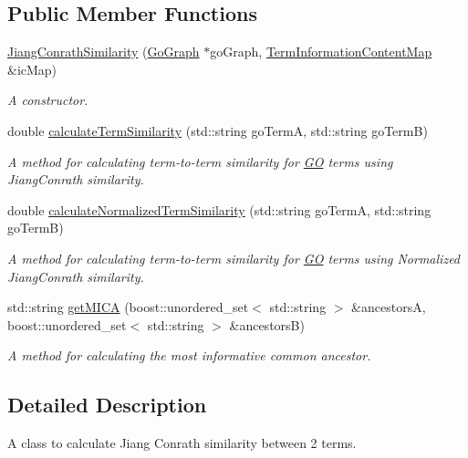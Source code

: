 \subsection*{Public Member Functions}
\begin{DoxyCompactItemize}
\item 
\hyperlink{classJiangConrathSimilarity_addd16c8b26721f64b954c3006aa2ed26}{Jiang\+Conrath\+Similarity} (\hyperlink{classGoGraph}{Go\+Graph} $\ast$go\+Graph, \hyperlink{classTermInformationContentMap}{Term\+Information\+Content\+Map} \&ic\+Map)
\begin{DoxyCompactList}\small\item\em A constructor. \end{DoxyCompactList}\item 
double \hyperlink{classJiangConrathSimilarity_a110fcc0d8b68b6dde9e90d897c859034}{calculate\+Term\+Similarity} (std\+::string go\+TermA, std\+::string go\+TermB)
\begin{DoxyCompactList}\small\item\em A method for calculating term-\/to-\/term similarity for \hyperlink{namespaceGO}{GO} terms using Jiang\+Conrath similarity. \end{DoxyCompactList}\item 
double \hyperlink{classJiangConrathSimilarity_a489dcbef15f4a5063af79cb03920cdf9}{calculate\+Normalized\+Term\+Similarity} (std\+::string go\+TermA, std\+::string go\+TermB)
\begin{DoxyCompactList}\small\item\em A method for calculating term-\/to-\/term similarity for \hyperlink{namespaceGO}{GO} terms using Normalized Jiang\+Conrath similarity. \end{DoxyCompactList}\item 
std\+::string \hyperlink{classJiangConrathSimilarity_a9a72b8c9687bfd578d8c51ec8564e87c}{get\+M\+I\+CA} (boost\+::unordered\+\_\+set$<$ std\+::string $>$ \&ancestorsA, boost\+::unordered\+\_\+set$<$ std\+::string $>$ \&ancestorsB)
\begin{DoxyCompactList}\small\item\em A method for calculating the most informative common ancestor. \end{DoxyCompactList}\end{DoxyCompactItemize}


\subsection{Detailed Description}
A class to calculate Jiang Conrath similarity between 2 terms. 

